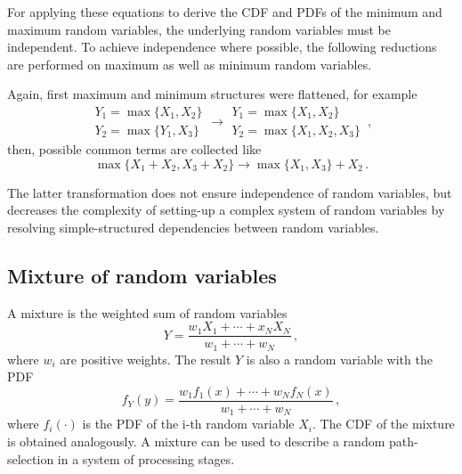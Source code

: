 For applying these equations to derive the CDF and PDFs of the minimum and maximum random variables, the 
underlying random variables must be independent. To achieve independence where possible, the following 
reductions are performed on maximum as well as minimum random variables.

Again, first maximum and minimum structures were flattened, for example
\begin{equation}
 \begin{array}{l}
  Y_1 = \max\{X_1,X_2\}\\
  Y_2 = \max\{Y_1,X_3\}
 \end{array} \longrightarrow
 \begin{array}{l}
  Y_1 = \max\{X_1,X_2\}\\
  Y_2 = \max\{X_1,X_2,X_3\}
 \end{array}\,, \nonumber
\end{equation}
then, possible common terms are collected like
\begin{equation}
 \max\{X_1 + X_2, X_3 + X_2\} \longrightarrow \max\{X_1,X_3\}+X_2\,. \nonumber
\end{equation}

The latter transformation does not ensure independence of random variables, but 
decreases the complexity of setting-up a complex system of random variables by 
resolving simple-structured dependencies between random variables.

\subsection{Mixture of random variables}
A mixture is the weighted sum of random variables
\begin{equation}
 Y = \frac{w_1X_1+\cdots+x_NX_N}{w_1+\cdots+w_N}\,, \nonumber
\end{equation}
where $w_i$ are positive weights. The result $Y$ is also a random variable with the PDF
\begin{equation}
 f_Y(y) = \frac{w_1f_1(x)+\cdots+w_Nf_N(x)}{w_1+\cdots+w_N}\,,\nonumber
\end{equation}
where $f_i(\cdot)$ is the PDF of the i-th random variable $X_i$. The CDF of the
mixture is obtained analogously. A mixture can be used to describe a random 
path-selection in a system of processing stages. 

